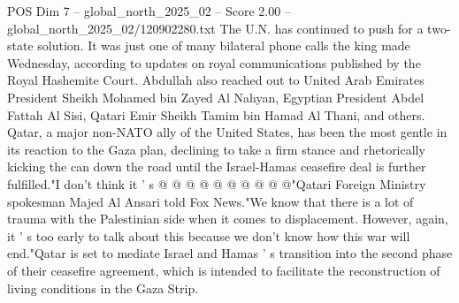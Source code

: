 \begin{textsample}{POS Dim 7 – global\_north\_2025\_02 – Score 2.00 – global\_north\_2025\_02/120902280.txt}
The U.N. has continued to push for a two-state solution.
It was just one of many bilateral phone calls the king made Wednesday, according to updates on royal communications published by the Royal Hashemite Court.
Abdullah also reached out to United Arab Emirates President Sheikh Mohamed bin Zayed Al Nahyan, Egyptian President Abdel Fattah Al Sisi, Qatari Emir Sheikh Tamim bin Hamad Al Thani, and others.
Qatar, a major non-NATO ally of the United States, has been the most gentle in its reaction to the Gaza plan, declining to take a firm stance and rhetorically kicking the can down the road until the Israel-Hamas ceasefire deal is further fulfilled."I don't think it ' s @ @ @ @ @ @ @ @ @ @"Qatari Foreign Ministry spokesman Majed Al Ansari told Fox News."We know that there is a lot of trauma with the Palestinian side when it comes to displacement.
However, again, it ' s too early to talk about this because we don't know how this war will end."Qatar is set to mediate Israel and Hamas ' s transition into the second phase of their ceasefire agreement, which is intended to facilitate the reconstruction of living conditions in the Gaza Strip.

\end{textsample}
